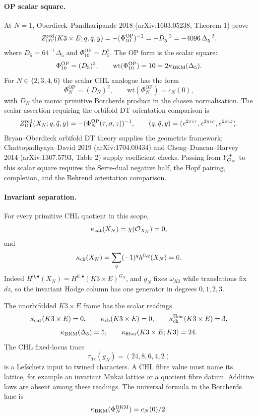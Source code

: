 \paragraph{OP scalar square.}
At $N=1$, Oberdieck--Pandharipande 2018 (arXiv:1603.05238, Theorem 1)
prove
\[
  Z^{\mathrm{red}}_{\mathrm{DT}}(K3\times E;q,\tilde q,y)
  =
  -(\Phi_{10}^{\mathrm{OP}})^{-1}
  =
  -D_5^{-2}
  =
  -4096\,\Delta_5^{-2},
\]
where $D_5=64^{-1}\Delta_5$ and
$\Phi_{10}^{\mathrm{OP}}=D_5^2$.  The OP form is the scalar square:
\[
  \Phi_{10}^{\mathrm{OP}}=(D_5)^2,
  \qquad
  \mathrm{wt}(\Phi_{10}^{\mathrm{OP}})=10=2\kappa_{\mathrm{BKM}}(\Delta_5).
\]
For $N\in\{2,3,4,6\}$ the scalar CHL analogue has the form
\[
  \Phi_N^{\mathrm{OP}}=(D_N)^2,
  \qquad
  \mathrm{wt}(\Phi_N^{\mathrm{OP}})=c_N(0),
\]
with $D_N$ the monic primitive Borcherds product in the chosen
normalisation.  The scalar assertion requiring the orbifold DT
orientation comparison is
\[
  Z^{\mathrm{red}}_{\mathrm{DT}}(X_N;q,\tilde q,y)
  =
  -(\Phi_N^{\mathrm{OP}}(\tau,\sigma,z))^{-1},
  \qquad
  (q,\tilde q,y)=(e^{2\pi i\tau},e^{2\pi i\sigma},e^{2\pi iz}).
\]
Bryan--Oberdieck orbifold DT theory supplies the geometric framework;
Chattopadhyaya--David 2019 (arXiv:1704.00434) and
Cheng--Duncan--Harvey 2014 (arXiv:1307.5793, Table 2) supply coefficient
checks.  Passing from $Y^{+}_{G_N}$ to this scalar square requires the
Serre-dual negative half, the Hopf pairing, completion, and the Behrend
orientation comparison.

\paragraph{Invariant separation.}
For every primitive CHL quotient in this scope,
\[
  \kappa_{\mathrm{cat}}(X_N)
  =
  \chi(\mathcal{O}_{X_N})
  =
  0,
\]
and
\[
  \kappa_{\mathrm{ch}}(X_N)
  =
  \sum_q(-1)^q h^{0,q}(X_N)
  =
  0 .
\]
Indeed $H^{0,\bullet}(X_N)=H^{0,\bullet}(K3\times E)^{G_N}$, and
$g_N$ fixes $\omega_{K3}$ while translations fix $dz$, so the invariant
Hodge column has one generator in degrees $0,1,2,3$.

The unorbifolded $K3\times E$ frame has the scalar readings
\[
  \kappa_{\mathrm{cat}}(K3\times E)=0,\qquad
  \kappa_{\mathrm{ch}}(K3\times E)=0,\qquad
  \kappa_{\mathrm{ch}}^{\mathrm{Heis}}(K3\times E)=3,
\]
\[
  \kappa_{\mathrm{BKM}}(\Delta_5)=5,\qquad
  \kappa_{\mathrm{fiber}}(K3\times E;K3)=24.
\]
The CHL fixed-locus trace
\[
  \tau_{\mathrm{fix}}(g_N)
  =
  (24,8,6,4,2)
\]
is a Lefschetz input to twined characters.  A CHL fibre value must name
its lattice, for example an invariant Mukai lattice or a quotient fibre
datum.  Additive laws are absent among these readings.  The universal
formula in the Borcherds lane is
\[
  \kappa_{\mathrm{BKM}}(\Phi_N^{\mathrm{BKM}})=c_N(0)/2.
\]

